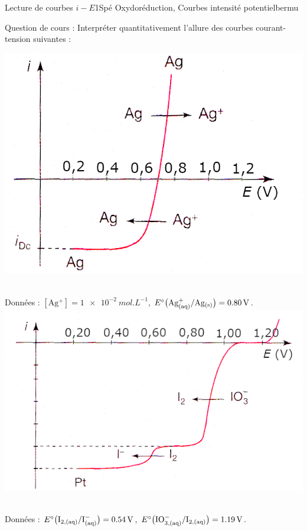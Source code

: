 \begin{exercise}{Lecture de courbes $i-E$}{1}{Spé}
{Oxydoréduction, Courbes intensité potentiel}{bermu}

\textsf{Question de cours :} Interpréter quantitativement l’allure des courbes courant-tension suivantes :
\begin{questions}
    \question \hfill\includegraphics[valign=t,scale=1.5]{chimie/i-E/iE-2.png}\hfill ~
    
    \textsf{Données :} $[\mathrm{Ag^+}] = \SI{1e-2}{mol.L^{-1}}$, $E^\circ\qty\big(\mathrm{Ag^+_{(aq)}/Ag_{(s)}}) = \SI{0.80}{V}$.
    \question \hfill\includegraphics[valign=t,scale=1.5]{chimie/i-E/iE-1.png}\hfill ~

    \textsf{Données :} $E^\circ\qty\big(\mathrm{I_{2,(aq)}/I^-_{(aq)}}) = \SI{0.54}{V}$, $E^\circ\qty\big(\mathrm{IO^-_{3,(aq)}/I_{2,(aq)}}) = \SI{1.19}{V}$.
\end{questions}

\end{exercise}

